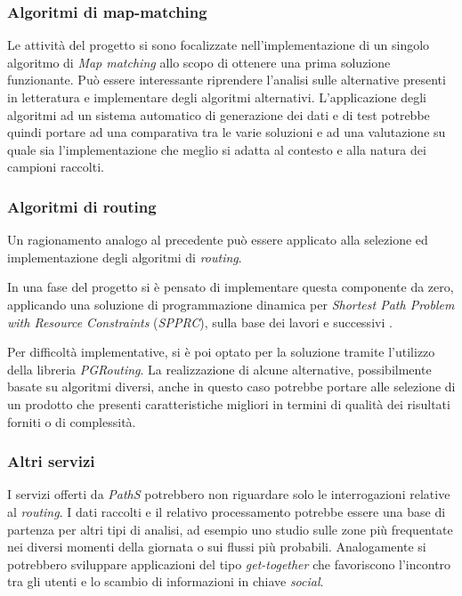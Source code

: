 \subsubsection{Algoritmi di map-matching}
Le attività del progetto si sono focalizzate nell'implementazione di un singolo algoritmo di \emph{Map matching} allo scopo di ottenere una prima soluzione funzionante. Può essere interessante riprendere l'analisi sulle alternative presenti in letteratura e implementare degli algoritmi alternativi. L'applicazione degli algoritmi ad un sistema automatico di generazione dei dati e di test potrebbe quindi portare ad una comparativa tra le varie soluzioni e ad una valutazione su quale sia l'implementazione che meglio si adatta al contesto e alla natura dei campioni raccolti.

\subsubsection{Algoritmi di routing}
Un ragionamento analogo al precedente può essere applicato alla selezione ed implementazione degli algoritmi di \emph{routing}. 

In una fase del progetto si è pensato di implementare questa componente da zero, applicando una soluzione di programmazione dinamica per \emph{Shortest Path Problem with Resource Constraints} (\emph{SPPRC}), sulla base dei lavori \cite[Desrochers~e~Soumis]{labelling} e successivi \cite[capitolo~4.4]{spprc}. 

Per difficoltà implementative, si è poi optato per la soluzione tramite l'utilizzo della libreria \emph{PGRouting}. La realizzazione di alcune alternative, possibilmente basate su algoritmi diversi, anche in questo caso potrebbe portare alle selezione di un prodotto che presenti caratteristiche migliori in termini di qualità dei risultati forniti o di complessità.

\subsubsection{Altri servizi}
I servizi offerti da \emph{PathS} potrebbero non riguardare solo le interrogazioni relative al \emph{routing}. I dati raccolti e il relativo processamento potrebbe essere una base di partenza per altri tipi di analisi, ad esempio uno studio sulle zone più frequentate nei diversi momenti della giornata o sui flussi più probabili. Analogamente si potrebbero sviluppare applicazioni del tipo \emph{get-together} che favoriscono l'incontro tra gli utenti e lo scambio di informazioni in chiave \emph{social}.
